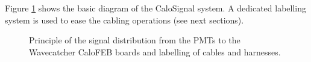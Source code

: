 \documentclass[12pt,a4paper]{article}
\newcommand{\pdftextimgpath}{./pdftex_t}
\begin{document}
\noindent\par Figure \ref{fig:calosignal:principle:1}  shows the basic
diagram of the CaloSignal system. A dedicated labelling system is used
to ease the cabling operations (see next sections).

\begin{figure}[h!]
  \begin{center}
    \scalebox{0.75}{}
  \end{center}
  \caption{Principle of the  signal distribution from the  PMTs to the
    Wavecatcher CaloFEB boards and labelling of cables and harnesses.}
  \label{fig:calosignal:principle:1}
\end{figure}

\clearpage



\end{document}
